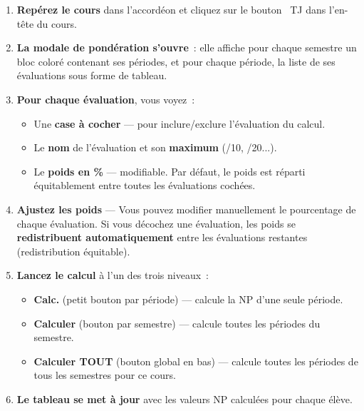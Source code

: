 \begin{etape}[title=Proc\'edure d\'etaill\'ee : Calculer TJ avec pond\'eration]
\begin{enumerate}[leftmargin=1.5cm,label=\textbf{\arabic*.},itemsep=12pt]
  \item \textbf{Rep\'erez le cours} dans l'accord\'eon et cliquez sur le bouton \textcolor{amber}{\faBolt\ TJ} dans l'en-t\^ete du cours.

  \item \textbf{La modale de pond\'eration s'ouvre}~: elle affiche pour chaque semestre un bloc color\'e contenant ses p\'eriodes, et pour chaque p\'eriode, la liste de ses \'evaluations sous forme de tableau.

  \item \textbf{Pour chaque \'evaluation}, vous voyez~:
  \begin{itemize}
    \item Une \textbf{case \`a cocher} --- pour inclure/exclure l'\'evaluation du calcul.
    \item Le \textbf{nom} de l'\'evaluation et son \textbf{maximum} (/10, /20...).
    \item Le \textbf{poids en \%} --- modifiable. Par d\'efaut, le poids est r\'eparti \'equitablement entre toutes les \'evaluations coch\'ees.
  \end{itemize}

  \item \textbf{Ajustez les poids} --- Vous pouvez modifier manuellement le pourcentage de chaque \'evaluation. Si vous d\'ecochez une \'evaluation, les poids se \textbf{redistribuent automatiquement} entre les \'evaluations restantes (redistribution \'equitable).

  \item \textbf{Lancez le calcul} \`a l'un des trois niveaux~:
  \begin{itemize}
    \item \textbf{Calc.} (petit bouton par p\'eriode) --- calcule la NP d'une seule p\'eriode.
    \item \textbf{Calculer} (bouton par semestre) --- calcule toutes les p\'eriodes du semestre.
    \item \textbf{Calculer TOUT} (bouton global en bas) --- calcule toutes les p\'eriodes de tous les semestres pour ce cours.
  \end{itemize}

  \item \textbf{Le tableau se met \`a jour} avec les valeurs NP calcul\'ees pour chaque \'el\`eve.
\end{enumerate}
\end{etape}

